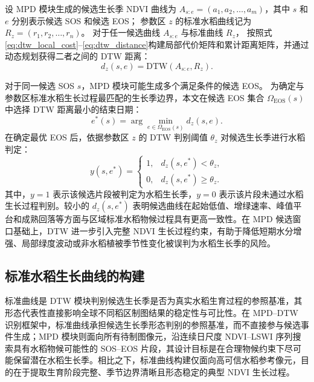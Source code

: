 设 MPD 模块生成的候选生长季 NDVI 曲线为 \(A_{s:e}=(a_1,a_2,\ldots,a_m)\)，其中 \(s\) 和 \(e\) 分别表示候选 SOS 和候选 EOS；
参数区 \(z\) 的标准水稻曲线记为 \(R_z=(r_1,r_2,\ldots,r_n)\)。
对于任一候选曲线 \(A_{s:e}\) 与标准曲线 \(R_z\)，
按照式\ref{eq:dtw_local_cost}--\ref{eq:dtw_distance}构建局部代价矩阵和累计距离矩阵，并通过动态规划获得二者之间的 DTW 距离：
\[
    d_z(s,e)=\mathrm{DTW}(A_{s:e},R_z).
\]



对于同一候选 SOS \(s\)，MPD 模块可能生成多个满足条件的候选 EOS。
为确定与参数区标准水稻生长过程最匹配的生长季边界，本文在候选 EOS 集合
\(\Omega_{\mathrm{EOS}}(s)\) 中选择 DTW 距离最小的结束日期：
\begin{equation}
    e^{*}(s)=\arg\min_{e\in\Omega_{\mathrm{EOS}}(s)} d_z(s,e).
    \label{eq:best_eos}
\end{equation}
在确定最优 EOS 后，依据参数区 \(z\) 的 DTW 判别阈值 \(\theta_z\) 对候选生长季进行水稻判定：
\begin{equation}
    y(s,e^{*})=
    \left\{
    \begin{array}{ll}
        1, & d_z(s,e^{*})<\theta_z,\\
        0, & d_z(s,e^{*})\geq\theta_z.
    \end{array}
    \right.
    \label{eq:dtw_threshold}
\end{equation}
其中，\(y=1\) 表示该候选片段被判定为水稻生长季，\(y=0\) 表示该片段未通过水稻生长过程判别。较小的 \(d_z(s,e^{*})\) 表明候选曲线在起始低值、增绿速率、峰值平台和成熟回落等方面与区域标准水稻物候过程具有更高一致性。在 MPD 候选窗口基础上，DTW 进一步引入完整 NDVI 生长过程约束，有助于降低短期水分增强、局部绿度波动或非水稻植被季节性变化被误判为水稻生长季的风险。

\subsection{标准水稻生长曲线的构建}
标准曲线是 DTW 模块判别候选生长季是否为真实水稻生育过程的参照基准，其形态代表性直接影响全球不同稻区制图结果的稳定性与可比性。在 MPD--DTW 识别框架中，标准曲线承担候选生长季形态判别的参照基准，而不直接参与候选事件生成；MPD 模块则面向所有待制图像元，沿连续日尺度 NDVI--LSWI 序列搜索具有水稻物候可能性的 SOS--EOS 片段，其设计目标是在合理物候约束下尽可能保留潜在水稻生长季。相比之下，标准曲线构建仅面向高可信水稻参考像元，目的在于提取生育阶段完整、季节边界清晰且形态稳定的典型 NDVI 生长过程。

